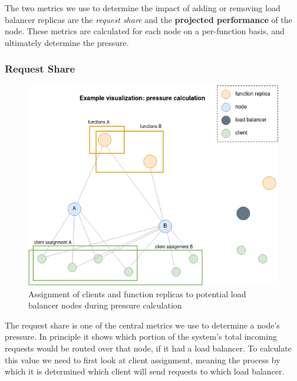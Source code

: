 \documentclass[draft,final]{vutinfth} %
\begin{document}
The two metrics we use to determine the impact of adding or removing load balancer replicas are the \textit{request share} and the \textbf{projected performance} of the node.
These metrics are calculated for each node on a per-function basis, and ultimately determine the pressure.

\subsubsection{Request Share}
\begin{figure}
    \centering
    \includegraphics[width=12cm]{graphics/diagrams/client_lb_assignment.png}
    \caption{Assignment of clients and function replicas to potential load balancer nodes during pressure calculation}
    \label{fig:cl_lb_assignment}
\end{figure}
The request share is one of the central metrics we use to determine a node's pressure. In principle it shows which portion of the system's total incoming requests would be routed over that node, if it had a load balancer.
To calculate this value we need to first look at client assignment, meaning the process by which it is determined which client will send requests to which load balancer.
\end{document}
